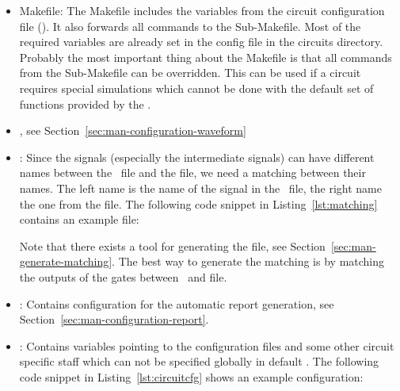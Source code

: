 \begin{itemize}
\item
  Makefile: The Makefile includes the variables from the circuit
  configuration file (\configcfg). It also forwards all commands to the
  Sub-Makefile. Most of the required variables are already set in the
  config file in the circuits directory. Probably the most important
  thing about the Makefile is that all commands from the Sub-Makefile
  can be overridden. This can be used if a circuit requires special
  simulations which cannot be done with the default set of 
  functions provided by the \invt.
\item
  , see Section~\ref{sec:man-configuration-waveform}
\item
  : Since the signals (especially the intermediate signals) can
  have different names between the \spfile\ file and the  file, we 
  need a  matching between their names. The left name is the name of the signal
  in the \spfile\ file, the right name the one from the  file. The
  following code snippet in Listing~\ref{lst:matching} contains an example 
   file:


Note that there exists a tool for generating the  file, see 
Section~\ref{sec:man-generate-matching}. The best way to generate the matching 
is by matching the outputs of the gates between \spfile\ and  file.

\item
  : Contains configuration for the automatic report 
  generation, see Section~\ref{sec:man-configuration-report}.
\item
  \configcfg: Contains variables pointing to the configuration files and
  some other circuit specific staff which can not be specified globally
  in default \configcfg. The following code snippet in 
  Listing~\ref{lst:circuitcfg} shows an example configuration:



\end{itemize}
